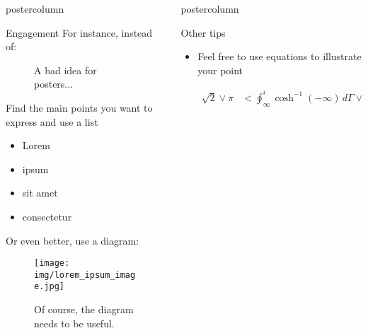 \documentclass{beamer}
\newlength{\columnheight}
\begin{document}
\begin{frame}
\begin{columns}
\begin{column}{.43\textwidth}
\begin{beamercolorbox}[center]{postercolumn}
\begin{minipage}{.98\textwidth}
{\begin{myblock}{Engagement}
                        For instance, instead of:

                        \begin{figure}
                            \centering
                            \caption{A bad idea for posters...}
                            \label{fig:my_label}
                        \end{figure}

                        Find the main points you want to express and use a list
                        \begin{itemize}
                            \item Lorem
                            \item ipsum
                            \item sit amet
                            \item consectetur
                        \end{itemize}

                        Or even better, use a diagram:

                        \begin{figure}
                            \centering
                            \texttt{[image: img/lorem\_ipsum\_image.jpg]}
                            \caption{Of course, the diagram needs to be useful.}
                            \label{fig:my_label}
                        \end{figure}

					\end{myblock}\vfill
		}\end{minipage}\end{beamercolorbox}
	\end{column}
	\begin{column}{.57\textwidth}
		\begin{beamercolorbox}[center]{postercolumn}
			\begin{minipage}{.98\textwidth} %
				\parbox[t][\columnheight]{\textwidth}{
					\begin{myblock}{Other tips}
    						\begin{itemize}
        						\item Feel free to use equations to illustrate your point

        						\begin{align*}
            						\sqrt{2} \vee \pi & < \oint_{\infty}^{i} \cosh^{-1} \left(-\infty \right) \,d \Gamma \vee \dots \pm \cosh^{-1} \left( e \Delta \right).
        						\end{align*}


\end{itemize}
\end{myblock}}
\end{minipage}
\end{beamercolorbox}
\end{column}
\end{columns}
\end{frame}
\end{document}
